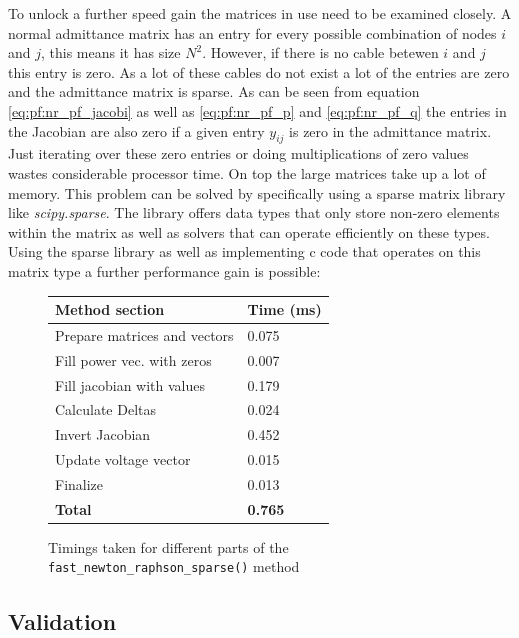 To unlock a further speed gain the matrices in use need to be examined closely. A normal admittance matrix has 
an entry for every possible combination of nodes $i$ and $j$, this means it has size $N^2$. However, if there is
no cable betewen $i$ and $j$ this entry is zero. As a lot of these cables do not exist a lot of the entries are zero
and the admittance matrix is sparse.
As can be seen from equation \ref{eq:pf:nr_pf_jacobi} as well as \ref{eq:pf:nr_pf_p} and \ref{eq:pf:nr_pf_q} the entries
in the Jacobian are also zero if a given entry $y_{ij}$ is zero in the admittance matrix.\\
Just iterating over these zero entries or doing multiplications of zero values wastes considerable processor time. On top
the large matrices take up a lot of memory. This problem can be solved by specifically using
a sparse matrix library like \textit{scipy.sparse}\autocite{2020SciPy-NMeth}. The library offers
data types that only store non-zero elements within the matrix as well as solvers that can operate
efficiently on these types.\\
Using the sparse library as well as implementing c code that operates on this matrix type a
further performance gain is possible:

\begin{figure}[H]
    \begin{center}
        \begin{tabular}{ll}
            \textbf{Method section} & \textbf{Time (ms)}\\
            \hline
            Prepare matrices and vectors & 0.075\\
            Fill power vec. with zeros &  0.007\\
            Fill jacobian with values & 0.179\\
            Calculate Deltas &      0.024\\
            Invert Jacobian &      0.452\\
            Update voltage vector & 0.015\\
            Finalize & 0.013\\
            \hline
            \textbf{Total} & \textbf{0.765}
        \end{tabular}
    \end{center}
\caption{Timings taken for different parts of the \texttt{fast\_newton\_raphson\_sparse()} method}
\end{figure}

\subsection{Validation}

